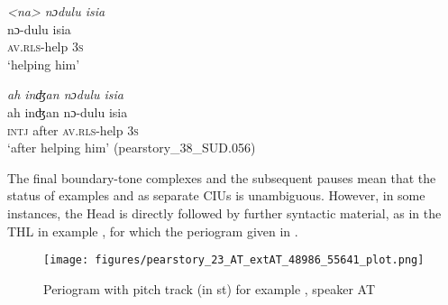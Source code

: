 \ea
\label{ex:THL2}
\ea
	\label{ex:nodulu isia}
	\textit{<na> nɔdulu isia} \\
	\gll  nɔ-dulu isia\\
	\textsc{av.rls}-help \textsc{3s}\\
	\glt `helping him'


\ex
	\label{ah injan nodulu isia}
	\textit{ah inʤan nɔdulu isia} \\
	\gll ah inʤan nɔ-dulu isia\\
	\textsc{intj} after \textsc{av.rls}-help \textsc{3s}\\
	\glt `after helping him' \hfill(pearstory\_38\_SUD.056)

\z
\z

The final boundary-tone complexes and the subsequent pauses mean that the status of  examples	 and  	 as separate CIUs is unambiguous. However, in some instances, the Head is directly followed by further syntactic material, as in the THL in example , for which the periogram given in   .





\begin{figure}
	\texttt{[image: figures/pearstory\_23\_AT\_extAT\_48986\_55641\_plot.png]}
	\caption{Periogram with pitch track (in st) for example , speaker AT}
	\label{pitch:THL+IU}
\end{figure}


\ea
\label{ex:THL+IU}

\newpage
{}

